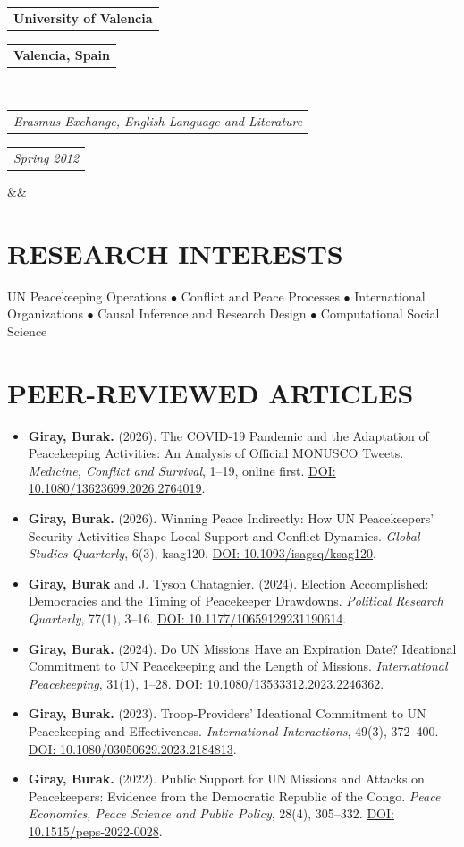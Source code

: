 \documentclass[11pt,a4paper,roman]{moderncv}
\makeatletter
\newcommand*{\customcventry}[7][.25em]{%
	\begin{tabular}{@{}l}{\bfseries #4}\end{tabular}%
	\hfill%
	\begin{tabular}{l@{}}{\bfseries #5}\end{tabular}\\
	\begin{tabular}{@{}l}{\itshape #3}\end{tabular}%
	\hfill%
	\begin{tabular}{l@{}}{\itshape #2}\end{tabular}%
	\ifx&#7&%
	\else{\\%
		\begin{minipage}{\maincolumnwidth}\small#7\end{minipage}}\fi%
	\par\addvspace{#1}}
\makeatother
\begin{document}
	\customcventry{Spring 2012}{Erasmus Exchange, English Language and Literature}{University of Valencia}{Valencia, Spain}{}{}
	
	\section{RESEARCH INTERESTS}
	
	UN Peacekeeping Operations $\bullet$ Conflict and Peace Processes $\bullet$ International Organizations $\bullet$ Causal Inference and Research Design $\bullet$ Computational Social Science
	
	\section{PEER-REVIEWED ARTICLES}
	
	\begin{itemize}
		\item \textbf{Giray, Burak.} (2026). The COVID-19 Pandemic and the Adaptation of Peacekeeping Activities: An Analysis of Official MONUSCO Tweets. \textit{Medicine, Conflict and Survival}, 1--19, online first. \href{https://doi.org/10.1080/13623699.2026.2764019}{DOI: 10.1080/13623699.2026.2764019}.
		\item \textbf{Giray, Burak.} (2026). Winning Peace Indirectly: How UN Peacekeepers' Security Activities Shape Local Support and Conflict Dynamics. \textit{Global Studies Quarterly}, 6(3), ksag120. \href{https://doi.org/10.1093/isagsq/ksag120}{DOI: 10.1093/isagsq/ksag120}.
		\item \textbf{Giray, Burak} and J. Tyson Chatagnier. (2024). Election Accomplished: Democracies and the Timing of Peacekeeper Drawdowns. \textit{Political Research Quarterly}, 77(1), 3--16. \href{https://doi.org/10.1177/10659129231190614}{DOI: 10.1177/10659129231190614}.
		\item \textbf{Giray, Burak.} (2024). Do UN Missions Have an Expiration Date? Ideational Commitment to UN Peacekeeping and the Length of Missions. \textit{International Peacekeeping}, 31(1), 1--28. \href{https://doi.org/10.1080/13533312.2023.2246362}{DOI: 10.1080/13533312.2023.2246362}.
		\item \textbf{Giray, Burak.} (2023). Troop-Providers' Ideational Commitment to UN Peacekeeping and Effectiveness. \textit{International Interactions}, 49(3), 372--400. \href{https://doi.org/10.1080/03050629.2023.2184813}{DOI: 10.1080/03050629.2023.2184813}.
		\item \textbf{Giray, Burak.} (2022). Public Support for UN Missions and Attacks on Peacekeepers: Evidence from the Democratic Republic of the Congo. \textit{Peace Economics, Peace Science and Public Policy}, 28(4), 305--332. \href{https://doi.org/10.1515/peps-2022-0028}{DOI: 10.1515/peps-2022-0028}.
	\end{itemize}
	
\end{document}
